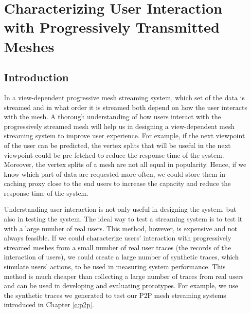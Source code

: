 \chapter{Characterizing User Interaction with Progressively Transmitted Meshes}
\label{c:user}
\section{Introduction}
In a view-dependent progressive mesh streaming system, which set of the data is streamed
and in what order it is streamed both depend on how the user interacts with the mesh. 
A thorough understanding of how users interact with the progressively streamed mesh will
help us in designing a view-dependent mesh streaming system to %
improve user experience. 
For example, if the next viewpoint of the user can be predicted, the vertex splits 
that will be useful in the next viewpoint could be pre-fetched 
to reduce the response time of the system. 
Moreover, the vertex splits of a mesh are not all equal in popularity. 
Hence, if we know which part of data are requested more often, we could
store them in caching proxy close to the end users to increase the capacity
and reduce the response time of the system. 



Understanding user interaction is not only useful in designing the system, but
also in testing the system. The ideal way to test a streaming system is to 
test it with a large number of real users. This method, however, is expensive 
and not always feasible. If we could characterize users' interaction with
progressively streamed meshes from a small number of real user traces
(the records of the interaction of users), 
we could create a large number of synthetic traces,
which simulate users' actions, to be used in measuring system performance. 
This method is much cheaper than collecting a large number of traces from real users
and can be used in developing and evaluating
prototypes. 
For example, we use the synthetic traces we generated to test our P2P mesh
streaming systems introduced in Chapter \ref{c:p2p}.



